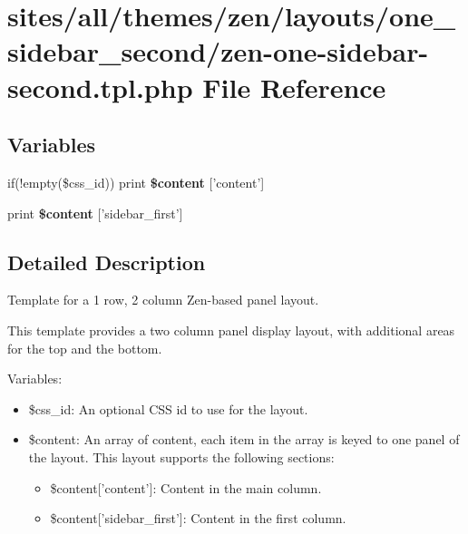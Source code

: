 \hypertarget{zen-one-sidebar-second_8tpl_8php}{
\section{sites/all/themes/zen/layouts/one\_\-sidebar\_\-second/zen-one-sidebar-second.tpl.php File Reference}
\label{zen-one-sidebar-second_8tpl_8php}
}
\subsection*{Variables}
\begin{CompactItemize}
\item 
\hypertarget{zen-one-sidebar-second_8tpl_8php_16767ac2e2b027ec00a0c12535d2ba7a}{
if(!empty(\$css\_\-id)) print \textbf{\$content} \mbox{[}'content'\mbox{]}}
\label{zen-one-sidebar-second_8tpl_8php_16767ac2e2b027ec00a0c12535d2ba7a}

\item 
\hypertarget{zen-one-sidebar-second_8tpl_8php_8fbe76276dfb5a084cc042c32e8e6394}{
print \textbf{\$content} \mbox{[}'sidebar\_\-first'\mbox{]}}
\label{zen-one-sidebar-second_8tpl_8php_8fbe76276dfb5a084cc042c32e8e6394}

\end{CompactItemize}


\subsection{Detailed Description}
Template for a 1 row, 2 column Zen-based panel layout.

This template provides a two column panel display layout, with additional areas for the top and the bottom.

Variables:\begin{itemize}
\item \$css\_\-id: An optional CSS id to use for the layout.\item \$content: An array of content, each item in the array is keyed to one panel of the layout. This layout supports the following sections:\begin{itemize}
\item \$content\mbox{[}'content'\mbox{]}: Content in the main column.\item \$content\mbox{[}'sidebar\_\-first'\mbox{]}: Content in the first column. \end{itemize}
\end{itemize}
